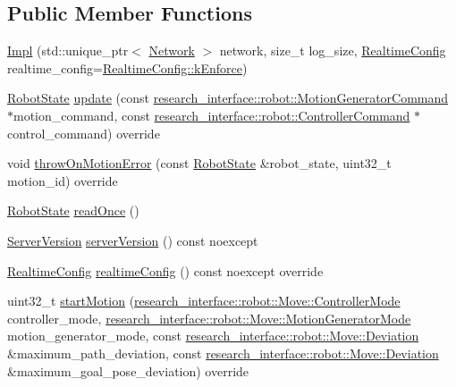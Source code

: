 \subsection*{Public Member Functions}
\begin{DoxyCompactItemize}
\item 
\hyperlink{classfranka_1_1Robot_1_1Impl_a091452543a9ef4ce4e347911bc14fbc1}{Impl} (std\+::unique\+\_\+ptr$<$ \hyperlink{classfranka_1_1Network}{Network} $>$ network, size\+\_\+t log\+\_\+size, \hyperlink{namespacefranka_aeede4f4629390fea21ca5e5a35a8a943}{Realtime\+Config} realtime\+\_\+config=\hyperlink{namespacefranka_aeede4f4629390fea21ca5e5a35a8a943a024bd586d70db805d622b85815bfa0de}{Realtime\+Config\+::k\+Enforce})
\item 
\hyperlink{structfranka_1_1RobotState}{Robot\+State} \hyperlink{classfranka_1_1Robot_1_1Impl_a961bcad42d2be61ff56b7004498fa8dd}{update} (const \hyperlink{structresearch__interface_1_1robot_1_1MotionGeneratorCommand}{research\+\_\+interface\+::robot\+::\+Motion\+Generator\+Command} $\ast$motion\+\_\+command, const \hyperlink{structresearch__interface_1_1robot_1_1ControllerCommand}{research\+\_\+interface\+::robot\+::\+Controller\+Command} $\ast$control\+\_\+command) override
\item 
void \hyperlink{classfranka_1_1Robot_1_1Impl_ace3373a95db9754ab9df732d9b1dd1f6}{throw\+On\+Motion\+Error} (const \hyperlink{structfranka_1_1RobotState}{Robot\+State} \&robot\+\_\+state, uint32\+\_\+t motion\+\_\+id) override
\item 
\hyperlink{structfranka_1_1RobotState}{Robot\+State} \hyperlink{classfranka_1_1Robot_1_1Impl_a0de2609b63c0f9ab6bab6e7180c021bf}{read\+Once} ()
\item 
\hyperlink{classfranka_1_1Robot_ad1dd3dccff6f33691d2c66eaa5ac5a10}{Server\+Version} \hyperlink{classfranka_1_1Robot_1_1Impl_af10ccd204c0d2f1c3ad5b7fd4f72be92}{server\+Version} () const noexcept
\item 
\hyperlink{namespacefranka_aeede4f4629390fea21ca5e5a35a8a943}{Realtime\+Config} \hyperlink{classfranka_1_1Robot_1_1Impl_a60b2747318e7c957834c62e83c204fbc}{realtime\+Config} () const noexcept override
\item 
uint32\+\_\+t \hyperlink{classfranka_1_1Robot_1_1Impl_a2f4073ded9e7ecc118a93d233c0f6ed7}{start\+Motion} (\hyperlink{structresearch__interface_1_1robot_1_1Move_a3e7b80b30bbf01dc902c84402502ebbc}{research\+\_\+interface\+::robot\+::\+Move\+::\+Controller\+Mode} controller\+\_\+mode, \hyperlink{structresearch__interface_1_1robot_1_1Move_a334b8380507154e8042b57fbd3287c0f}{research\+\_\+interface\+::robot\+::\+Move\+::\+Motion\+Generator\+Mode} motion\+\_\+generator\+\_\+mode, const \hyperlink{structresearch__interface_1_1robot_1_1Move_1_1Deviation}{research\+\_\+interface\+::robot\+::\+Move\+::\+Deviation} \&maximum\+\_\+path\+\_\+deviation, const \hyperlink{structresearch__interface_1_1robot_1_1Move_1_1Deviation}{research\+\_\+interface\+::robot\+::\+Move\+::\+Deviation} \&maximum\+\_\+goal\+\_\+pose\+\_\+deviation) override

\end{DoxyCompactItemize}
